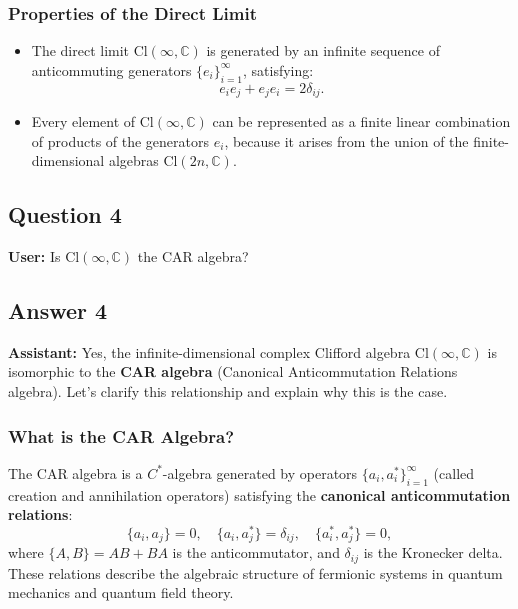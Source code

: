 \documentclass{article}
\begin{document}
\subsubsection{Properties of the Direct Limit}

\begin{itemize}
\item The direct limit $\text{Cl}(\infty, \mathbb{C})$ is generated by an
infinite sequence of anticommuting generators $\{e_i\}_{i=1}^\infty$,
satisfying:  
\begin{equation*}
e_i e_j + e_j e_i = 2 \delta_{ij}.  
\end{equation*}

\item Every element of $\text{Cl}(\infty, \mathbb{C})$ can be represented as
a finite linear combination of products of the generators $e_i$, because it
arises from the union of the finite-dimensional algebras $\text{Cl}(2n, 
\mathbb{C})$.
\end{itemize}

\subsection{Question 4}

\textbf{User:} Is $\text{Cl}(\infty, \mathbb{C})$ the CAR algebra?

\subsection{Answer 4}

\textbf{Assistant:} Yes, the infinite-dimensional complex Clifford algebra $%
\text{Cl}(\infty, \mathbb{C})$ is isomorphic to the \textbf{CAR algebra}
(Canonical Anticommutation Relations algebra). Let's clarify this
relationship and explain why this is the case.

\subsubsection{What is the CAR Algebra?}

The CAR algebra is a $C^*$-algebra generated by operators $\{a_i,
a_i^*\}_{i=1}^\infty$ (called creation and annihilation operators)
satisfying the \textbf{canonical anticommutation relations}: 
\begin{equation*}
\{a_i, a_j\} = 0, \quad \{a_i, a_j^*\} = \delta_{ij}, \quad \{a_i^*, a_j^*\}
= 0, 
\end{equation*}
where $\{A, B\} = AB + BA$ is the anticommutator, and $\delta_{ij}$ is the
Kronecker delta. These relations describe the algebraic structure of
fermionic systems in quantum mechanics and quantum field theory.
\end{document}
